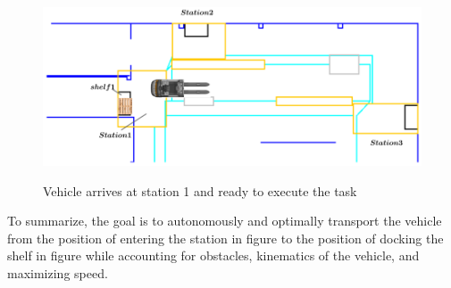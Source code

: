 \begin{figure}[H]
    \begin{center}
       \includegraphics[width=5in]{images/Chap0/arrive.png}\\
       \caption{Vehicle arrives at station 1 and ready to execute the task}
       \label{dock}
       \end{center}
\end{figure}

To summarize, the goal is to autonomously and optimally transport the vehicle from the position of entering the station in
figure  to the position of docking the shelf in figure  while accounting for obstacles,
kinematics of the vehicle, and maximizing speed. 

